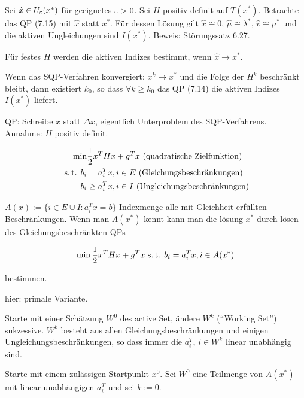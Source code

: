 Sei $\hat x \in U_\varepsilon (x^*)$ für geeignetes $\varepsilon>0$. Sei $H$ positiv definit auf $T(x^*)$. Betrachte das QP (7.15) mit $\hat x$ statt $x^*$. Für dessen Lösung gilt $\hat x \cong 0$, $\hat \mu \cong \lambda^*$, $\hat v \cong \mu^*$ und die aktiven Ungleichungen sind $I(x^*)$. Beweis: Störungssatz 6.27.


\bitm
\item Für festes $H$ werden die aktiven Indizes bestimmt, wenn $\hat x \to x^*$.
\item Wenn das SQP-Verfahren konvergiert: $x^k \to x^*$ und die Folge der $H^k$ beschränkt bleibt, dann existiert $k_0$, so dass $\forall k \geq k_0$ das QP (7.14) die aktiven Indizes $I(x^*)$ liefert.
\eitm


QP: Schreibe $x$ statt $\Delta x$, eigentlich Unterproblem des SQP-Verfahrens. Annahme: $H$ positiv definit.

\begin{align*}
\min &\frac 12 x^T H x + g^T x \text{ (quadratische Zielfunktion)} \\
\text{ s.\,t. } b_i &= a_i^T x, i \in E \text{ (Gleichungsbeschränkungen)} \\
b_i &\geq a_i^T x, i \in I \text{ (Ungleichungsbeschränkungen)} \\
\end{align*}

$A(x) := \{ i \in E \cup I : a_i^T x = b \}$ Indexmenge alle mit Gleichheit erfüllten Beschränkungen. Wenn man $A(x^*)$ kennt kann man die lösung $x^*$ durch lösen des Gleichungsbeschränkten QPs

\[ \min \frac 12 x^T H x + g^T x \text{ s.\,t. } b_i = a_i^T x, i \in A(x^*) \]

bestimmen.


hier: primale Variante.

Starte mit einer Schätzung $W^0$ des active Set, ändere $W^k$ ("`Working Set"') sukzessive. $W^k$ besteht aus allen Gleichungsbeschränkungen und einigen Ungleichungsbeschränkungen, so dass immer die $a_i^T$, $i \in W^k$ linear unabhängig sind.


\bitm
\item Starte mit einem zulässigen Startpunkt $x^0$. Sei $W^0$ eine Teilmenge von $A(x^*)$ mit linear unabhängigen $a_i^T$ und sei $k:=0$.

